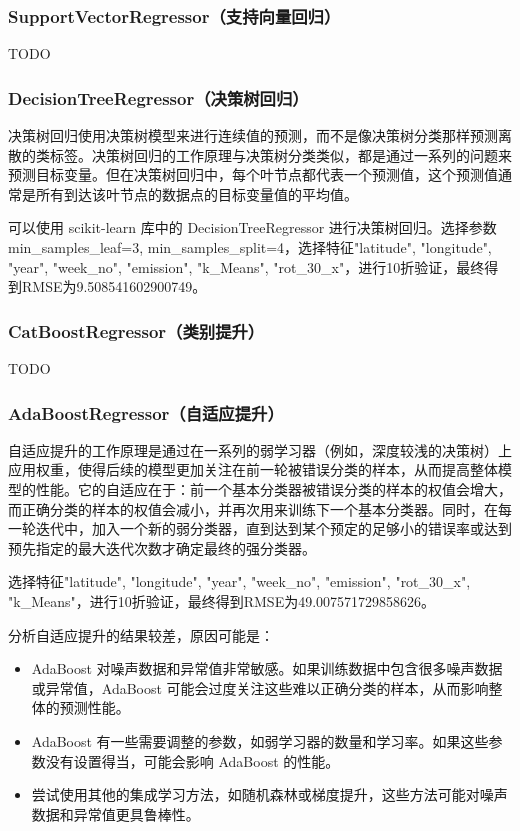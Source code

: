 \documentclass{ctexart}
\begin{document}
\subsubsection{SupportVectorRegressor（支持向量回归）}

TODO

\subsubsection{DecisionTreeRegressor（决策树回归）}

决策树回归使用决策树模型来进行连续值的预测，而不是像决策树分类那样预测离散的类标签。决策树回归的工作原理与决策树分类类似，都是通过一系列的问题来预测目标变量。但在决策树回归中，每个叶节点都代表一个预测值，这个预测值通常是所有到达该叶节点的数据点的目标变量值的平均值。

可以使用 scikit-learn 库中的 DecisionTreeRegressor 进行决策树回归。选择参数min\_samples\_leaf=3, min\_samples\_split=4，选择特征"latitude", "longitude", "year", "week\_no", "emission", "k\_Means", "rot\_30\_x"，进行10折验证，最终得到RMSE为9.508541602900749。

\subsubsection{CatBoostRegressor（类别提升）}

TODO

\subsubsection{AdaBoostRegressor（自适应提升）}

自适应提升的工作原理是通过在一系列的弱学习器（例如，深度较浅的决策树）上应用权重，使得后续的模型更加关注在前一轮被错误分类的样本，从而提高整体模型的性能。它的自适应在于：前一个基本分类器被错误分类的样本的权值会增大，而正确分类的样本的权值会减小，并再次用来训练下一个基本分类器。同时，在每一轮迭代中，加入一个新的弱分类器，直到达到某个预定的足够小的错误率或达到预先指定的最大迭代次数才确定最终的强分类器。

选择特征"latitude", "longitude", "year", "week\_no", "emission", "rot\_30\_x", "k\_Means"，进行10折验证，最终得到RMSE为49.007571729858626。

分析自适应提升的结果较差，原因可能是：

\begin{itemize}
      \item AdaBoost 对噪声数据和异常值非常敏感。如果训练数据中包含很多噪声数据或异常值，AdaBoost 可能会过度关注这些难以正确分类的样本，从而影响整体的预测性能。
      \item AdaBoost 有一些需要调整的参数，如弱学习器的数量和学习率。如果这些参数没有设置得当，可能会影响 AdaBoost 的性能。
      \item 尝试使用其他的集成学习方法，如随机森林或梯度提升，这些方法可能对噪声数据和异常值更具鲁棒性。
\end{itemize}
\end{document}
